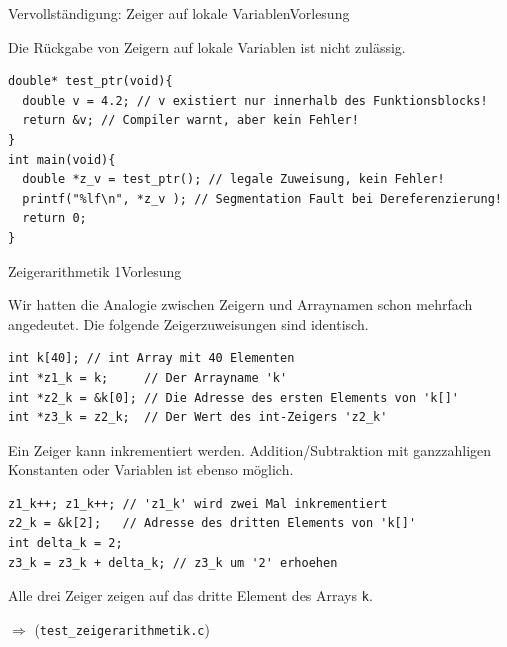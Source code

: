 \documentclass[xcolor=dvipsnames]{beamer}
\newcounter{lecturecounter}
\begin{document}
\begin{frame}[fragile]{Vervollständigung: Zeiger auf lokale Variablen}{Vorlesung }
  \begin{block}{}
    Die Rückgabe von Zeigern auf lokale Variablen ist nicht zulässig.
  \end{block}
  \begin{lstlisting}
double* test_ptr(void){
  double v = 4.2; // v existiert nur innerhalb des Funktionsblocks!
  return &v; // Compiler warnt, aber kein Fehler!
}
int main(void){
  double *z_v = test_ptr(); // legale Zuweisung, kein Fehler!
  printf("%lf\n", *z_v ); // Segmentation Fault bei Dereferenzierung!
  return 0;
}
  \end{lstlisting}
\end{frame}

\begin{frame}[fragile]{Zeigerarithmetik 1}{Vorlesung }
\begin{block}{}
  Wir hatten die Analogie zwischen Zeigern und Arraynamen schon mehrfach angedeutet. Die folgende Zeigerzuweisungen sind identisch.
\end{block}
\begin{lstlisting}
int k[40]; // int Array mit 40 Elementen
int *z1_k = k;     // Der Arrayname 'k'
int *z2_k = &k[0]; // Die Adresse des ersten Elements von 'k[]'
int *z3_k = z2_k;  // Der Wert des int-Zeigers 'z2_k'
\end{lstlisting}
\begin{block}{}
  Ein Zeiger kann inkrementiert werden. Addition/Subtraktion mit ganzzahligen Konstanten oder Variablen ist ebenso möglich. 
\end{block}
\begin{lstlisting}
z1_k++; z1_k++; // 'z1_k' wird zwei Mal inkrementiert
z2_k = &k[2];   // Adresse des dritten Elements von 'k[]'
int delta_k = 2;
z3_k = z3_k + delta_k; // z3_k um '2' erhoehen
\end{lstlisting}
\begin{block}{}
  Alle drei Zeiger zeigen auf das dritte Element des Arrays \texttt{k}.
\end{block}
$\Rightarrow$ (\verb|test_zeigerarithmetik.c|)
\end{frame}
\end{document}
